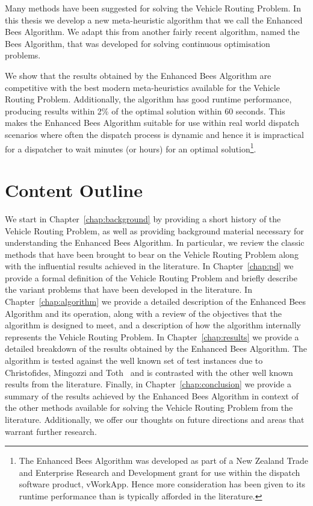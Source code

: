 Many methods have been suggested for solving the Vehicle Routing Problem. In this thesis we develop a new meta-heuristic algorithm that we call the Enhanced Bees Algorithm. We adapt this from another fairly recent algorithm, named the Bees Algorithm, that was developed for solving continuous optimisation problems.

We show that the results obtained by the Enhanced Bees Algorithm are competitive with the best modern meta-heuristics available for the Vehicle Routing Problem. Additionally, the algorithm has good runtime performance, producing results within 2\% of the optimal solution within 60 seconds. This makes the Enhanced Bees Algorithm suitable for use within real world dispatch scenarios where often the dispatch process is dynamic and hence it is impractical for a dispatcher to wait minutes (or hours) for an optimal solution\footnote{The Enhanced Bees Algorithm was developed as part of a New Zealand Trade and Enterprise Research and Development grant for use within the dispatch software product, vWorkApp. Hence more consideration has been given to its runtime performance than is typically afforded in the literature.}.

\section{Content Outline}

We start in Chapter~\ref{chap:background} by providing a short history of the Vehicle Routing Problem, as well as providing background material necessary for understanding the Enhanced Bees Algorithm. In particular, we review the classic methods that have been brought to bear on the Vehicle Routing Problem along with the influential results achieved in the literature. In Chapter~\ref{chap:pd} we provide a formal definition of the Vehicle Routing Problem and briefly describe the variant problems that have been developed in the literature. In Chapter~\ref{chap:algorithm} we provide a detailed description of the Enhanced Bees Algorithm and its operation, along with a review of the objectives that the algorithm is designed to meet, and a description of how the algorithm internally represents the Vehicle Routing Problem. In Chapter~\ref{chap:results} we provide a detailed breakdown of the results obtained by the Enhanced Bees Algorithm. The algorithm is tested against the well known set of test instances due to Christofides, Mingozzi and Toth~\cite{CMT:1981} and is contrasted with the other well known results from the literature. Finally, in Chapter~\ref{chap:conclusion} we provide a summary of the results achieved by the Enhanced Bees Algorithm in context of the other methods available for solving the Vehicle Routing Problem from the literature. Additionally, we offer our thoughts on future directions and areas that warrant further research.  
